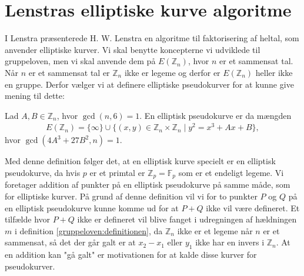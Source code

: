 \section{Lenstras elliptiske kurve algoritme}
I \cite{Lenstra}
Lenstra præsenterede H. W. Lenstra en algoritme til faktorisering af heltal, som anvender elliptiske kurver. Vi skal benytte koncepterne vi udviklede til gruppeloven, men vi skal anvende dem på $E(\mathbb{Z}_n)$, hvor $n$ er et sammensat tal. Når $n$ er et sammensat tal er $\mathbb{Z}_n$ ikke er legeme og derfor er $E(\mathbb{Z}_n)$ heller ikke en gruppe. Derfor vælger vi at definere elliptiske pseudokurver for at kunne give mening til dette:

\begin{definition}
Lad $A, B \in \mathbb{Z}_n$, hvor $\gcd(n, 6) = 1$. En elliptisk pseudokurve er da mængden
\begin{align*}
	E(\mathbb{Z}_n) = \{ \infty \} \cup \{ (x, y) \in \mathbb{Z}_n \times \mathbb{Z}_n \mid y^2 =x^3 + Ax +B \},
\end{align*}
hvor $\gcd(4A^3 + 27B^2, n) = 1$.
\end{definition}
Med denne definition følger det, at en elliptisk kurve specielt er en elliptisk pseudokurve, da hvis $p$ er et primtal er $\mathbb{Z}_p = \mathbb{F}_p$ som er et endeligt legeme. Vi foretager addition af punkter på en elliptisk pseudokurve på samme måde, som for elliptiske kurver. På grund af denne definition vil vi for to punkter $P$ og $Q$ på en elliptisk pseudokurve kunne komme ud for at $P+Q$ ikke vil være defineret. Et tilfælde hvor $P+Q$ ikke er defineret vil blive fanget i udregningen af hældningen $m$ i definition \ref{gruppeloven:definitionen}, da $\mathbb{Z}_n$ ikke er et legeme når $n$ er et sammensat, så det der går galt er at $x_2 - x_1$ eller $y_1$ ikke har en invers i $\mathbb{Z}_n$. At en addition kan "gå galt" er motivationen for at kalde disse kurver for pseudokurver.

